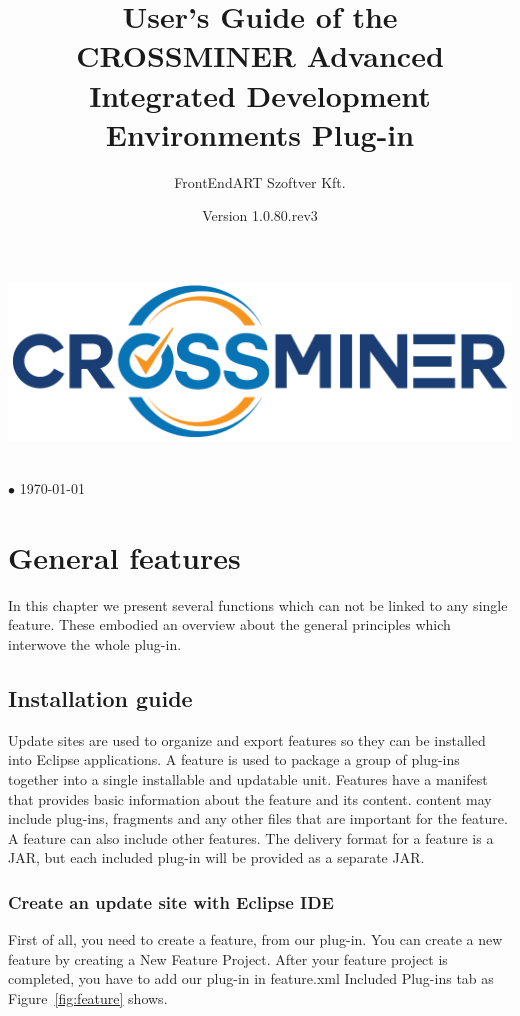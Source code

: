 \documentclass[11pt,a4paper]{book}
\author{FrontEndART Szoftver Kft.}
\title{User's Guide of the CROSSMINER Advanced Integrated Development Environments Plug-in}
\date{Version 1.0.80.rev3}
\makeatletter
\renewcommand{\maketitle}{
\vspace*{.1\textheight}
\begin{center}
	\includegraphics[width=.6\textwidth]{pic/CROSSMINER-logo-large.png}
\end{center}
\begin{center}
	\Huge\@title
\end{center}
\vfill
\begin{center}
	\large\@author\\\@date{} $\bullet$ \today
\end{center}
}
\makeatother
\begin{document}
	
\begin{titlepage}
	\maketitle
\end{titlepage}

\chapter{General features}

In this chapter we present several functions which can not be linked to any single feature.
These embodied an overview about the general principles which interwove the whole plug-in.

\section{Installation guide}
Update sites are used to organize and export features so they can be installed into Eclipse applications. A feature is used to package a group of plug-ins together into a single installable and updatable unit. Features have a manifest that provides basic information about the feature and its content. content may include plug-ins, fragments and any other files that are important for the feature. A feature can also include other features. The delivery format for a feature is a JAR, but each included plug-in will be provided as a separate JAR.

\subsection{Create an update site with Eclipse IDE}

First of all, you need to create a feature, from our plug-in. You can create a new feature by creating a New Feature Project. After your feature project is completed, you have to add our plug-in in feature.xml Included Plug-ins tab as Figure~\ref{fig:feature} shows.
\end{document}
